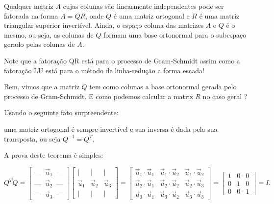 \documentclass[../livro.tex]{subfiles}  %
\begin{document}
\begin{theorem}
Qualquer matriz $A$ cujas colunas são linearmente independentes pode ser fatorada na forma $A=QR$, onde $Q$ é uma matriz ortogonal 
e $R$ é uma matriz triangular superior invertível. Ainda, o espaço coluna das matrizes $A$ e $Q$ é o mesmo, ou seja, as colunas de $Q$ formam uma base ortonormal para o subespaço gerado pelas colunas de $A$.
\end{theorem} 

Note que a fatoração QR está para o processo de Gram-Schmidt assim como a fatoração LU está para o método de  linha-redução a forma escada!  %

Bem, vimos que a matriz $Q$ tem como colunas a base ortonormal gerada pelo processo de Gram-Schmidt. E como podemos calcular a matriz $R$ no caso geral ? 

Usando o seguinte fato surpreendente: 

\begin{theorem}
uma matriz ortogonal é sempre invertível e sua inversa é dada pela sua transposta, ou seja $Q^{-1}= Q^T$.
\end{theorem}


A prova deste teorema é simples:
 
\[
Q^T Q =
\begin{bmatrix}
 \text{--- }\  \vec{u}_1 \, \text{ ---} \\
 \text{--- }\  \vec{u}_2 \, \text{ ---} \\
 \text{--- }\  \vec{u}_3 \, \text{ ---}
\end{bmatrix}
\begin{bmatrix}
 | & | & | \\
\vec{u}_1 & \vec{u}_2 & \vec{u}_3 \\
 | & | & |
\end{bmatrix} =
\begin{bmatrix}
 \vec{u}_1 \cdot \vec{u}_1 & \vec{u}_1 \cdot \vec{u}_2 & \vec{u}_1 \cdot \vec{u}_2 \\
 \vec{u}_2 \cdot \vec{u}_1 & \vec{u}_2 \cdot \vec{u}_2 & \vec{u}_2 \cdot \vec{u}_3 \\
 \vec{u}_3 \cdot \vec{u}_1 & \vec{u}_3 \cdot \vec{u}_2 & \vec{u}_3 \cdot \vec{u}_3
\end{bmatrix} =
\begin{bmatrix}
1 & 0 & 0 \\
0 & 1 & 0 \\
0 & 0 & 1
\end{bmatrix} = I.
\]
\end{document}

